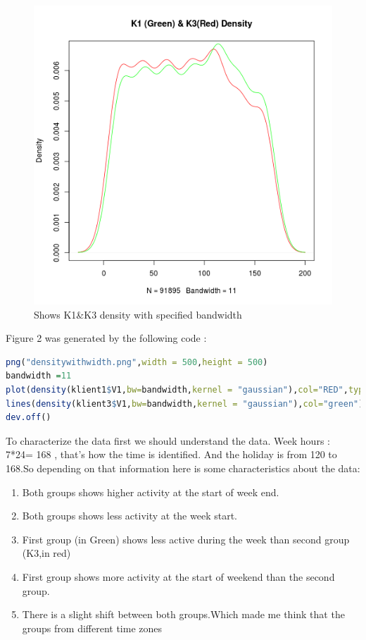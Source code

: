 \documentclass{article}
\begin{document}
\begin{flushleft}
\begin{figure}[H]
\begin{center}
\includegraphics[scale=1]{densitywithwidth.png}
\end{center}
\caption{Shows K1\&K3 density with specified bandwidth}
\end{figure}
Figure 2 was generated by the following code : 
\begin{lstlisting}[language=R]
png("densitywithwidth.png",width = 500,height = 500)
bandwidth =11
plot(density(klient1$V1,bw=bandwidth,kernel = "gaussian"),col="RED",type = "l",main="K1 (Green) & K3(Red) Density")
lines(density(klient3$V1,bw=bandwidth,kernel = "gaussian"),col="green")
dev.off()
\end{lstlisting}
\end{flushleft}
To characterize the data first we should understand the data.
Week hours  : 7*24= 168 , that's how the time is identified. And the holiday is from 120 to 168.So depending on that information here is some characteristics about the data:
\begin{enumerate}
	\item Both groups shows higher activity at the start of week end.
	\item Both groups shows less activity at the week start.
	\item First group (in Green) shows less active during the week than second group (K3,in red)
	\item First group shows more activity at the start of weekend than the second group.
	\item There is a slight shift between both groups.Which made me think that the groups from different time zones
\end{enumerate}
\end{document}
